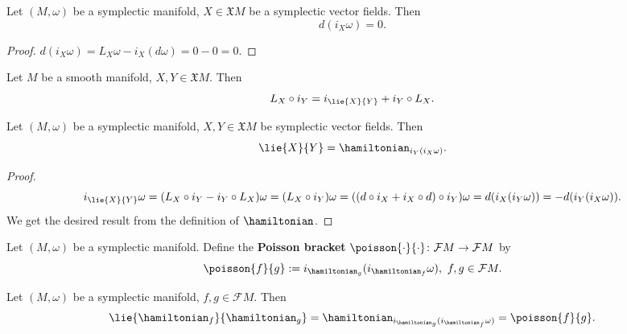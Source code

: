 \begin{proposition}
  Let
    $(M, \omega)$ be a symplectic manifold,
    $X \in \mathfrak{X} M$ be a symplectic vector fields.
  Then
  \begin{equation}
    d(i_X \omega) = 0.
  \end{equation}
\end{proposition}
\begin{proof}
  $
    d(i_X \omega)
    = L_X \omega - i_X(d \omega)
    = 0 - 0
    = 0.
  $
\end{proof}
\begin{proposition}
  Let $M$ be a smooth manifold, $X, Y \in \mathfrak{X} M$.
  Then
  \begin{equation}
    L_X \circ i_Y = i_{\lie{X}{Y}} + i_Y \circ L_X.
  \end{equation}
\end{proposition}
\begin{proposition}
  Let
    $(M, \omega)$ be a symplectic manifold,
    $X, Y \in \mathfrak{X} M$ be symplectic vector fields.
  Then
  \begin{equation}
    \lie{X}{Y} = \hamiltonian_{i_Y(i_X \omega)}.
  \end{equation}
\end{proposition}
\begin{proof}
  \begin{equation}
    i_{\lie{X}{Y}} \omega
    = (L_X \circ i_Y - i_Y \circ L_X) \omega
    = (L_X \circ i_Y) \omega
    = ((d \circ i_X + i_X \circ d) \circ i_Y) \omega
    = d(i_X(i_Y \omega))
    = - d(i_Y(i_X \omega)).
  \end{equation}
  We get the desired result from the definition of $\hamiltonian$.
\end{proof}
\begin{definition}
  Let $(M, \omega)$ be a symplectic manifold.
  Define the \textbf{Poisson bracket}
  $\poisson{\cdot}{\cdot} \colon \mathcal{F} M \to \mathcal{F} M$ by
  \begin{equation}
    \poisson{f}{g}
    := i_{\hamiltonian_g}(i_{\hamiltonian_f} \omega),\
    f, g \in \mathcal{F} M.
  \end{equation}
\end{definition}
\begin{corollary}
  Let $(M, \omega)$ be a symplectic manifold, $f, g \in \mathcal{F} M$.
  Then
  \begin{equation}
    \lie{\hamiltonian_f}{\hamiltonian_g}
    = \hamiltonian_{i_{\hamiltonian_g}(i_{\hamiltonian_f} \omega)}
    = \poisson{f}{g}.
  \end{equation}
\end{corollary}
